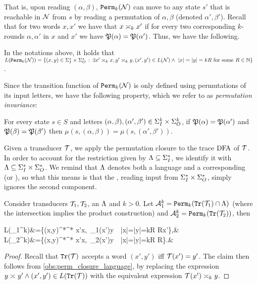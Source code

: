 That is, upon reading $(\alpha,\beta)$, $\perm_k(\cN)$ can move to any state $s'$ that is reachable in $\cN$ from $s$
by reading a permutation of $\alpha,\beta$ (denoted $\alpha',\beta'$).
Recall that for two words $x,x'$ we have that $x\req[k]x'$ if for every two corresponding $k$-rounds $\alpha,\alpha'$ in $x$ and $x'$ we have $\fP(\alpha)=\fP(\alpha')$. 
Thus, we have the following.
\begin{observation}
	\label{obs:perm_closure_language}
	In the notations above, it holds that $L(\perm_k(\cN))=\{(x,y)\in \sI^*\times \sO^* \ST \exists x'\req[k] x, y'\req[k] y, (x',y')\in L(\cN) \wedge\ |x|=|y|=kR \text{ for some }R\in \bbN\}$.
	\end{observation}
Since the transition function of $\perm_k(\cN)$ is only defined using permutations of its input letters, we have the following property, which we refer to as \emph{permutation invariance}:
\begin{observation}
	\label{obs:perm_invariance}
	For every state $s\in S$ and letters $(\alpha,\beta), (\alpha',\beta')\in \sI^k \times \sO^k$, if $\fP(\alpha)=\fP(\alpha')$ and $\fP(\beta)=\fP(\beta')$ then $\mu(s,(\alpha,\beta))=\mu(s,(\alpha',\beta'))$.
\end{observation}

Given a transducer $\cT$, we apply the permutation closure to the trace $\DFA$ of $\cT$. In order to account for the restriction given by $\fL\subseteq \sI^*$, we identify it with $\fL \subseteq \sI^*\times \sO^*$. We remind that $\fL$ denotes both a language and a corresponding \NFA (or \DFA), so what this means is that the \NFA, reading input from $\sI^*\times \sO^*$, simply ignores the second component.
\begin{lemma}
	\label{lem:permutation_closure_construction}
	Consider transducers $\cT_1,\cT_2$, an \NFA $\fL$ and $k>0$. Let $\cA_1^k=\perm_k(\tr(\cT_1)\cap \fL)$ (where the intersection implies the product \NFA construction) and $\cA_2^k=\perm_k(\tr(\cT_2))$, then
	\begin{flalign*}
	L(\cA_1^k)&=\{(x,y)\in \sI^*\times \sO^* \ST \exists x'\req[k] x,\ \cT_1(x')\req[k] y\ \wedge\ |x|=|y|=kR R\in \bbN \wedge x'\in \fL\},&\\
	L(\cA_2^k)&=\{(x,y)\in \sI^*\times \sO^* \ST \exists x'\req[k] x,\ \cT_2(x')\req[k] y\ \wedge\ |x|=|y|=kR R\in \bbN\}.&
	\end{flalign*}
\end{lemma}
\begin{proof}
	Recall that $\tr(\cT)$ accepts a word $(x',y')$ iff $\cT(x')=y'$. The claim then follows from \autoref{obs:perm_closure_language}, by replacing the expression $y\req y' \wedge (x',y')\in L(\tr(\cT))$ with the equivalent expression $\cT(x')\req[k] y$.
\end{proof}

